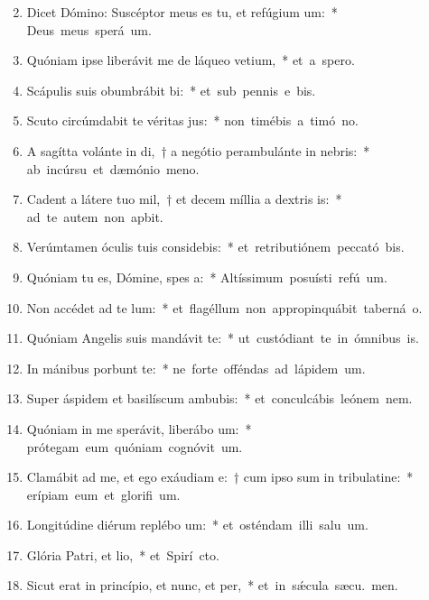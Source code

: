 \begin{flushleft}
\begin{enumerate}[leftmargin=*]
\setcounter{enumi}{1}

\item Dicet Dómino: Suscéptor meus es tu, et refúgium um:~* \mbox{Deus meus sperá  um.}
\item Quóniam ipse liberávit me de láqueo vetium,~* \mbox{et a  spero.}
\item Scápulis suis obumbrábit bi:~* \mbox{et sub pennis e bis.}
\item Scuto circúmdabit te véritas jus:~* \mbox{non timébis a timó no.}
\item A sagítta volánte in di,~† a negótio perambulánte in nebris:~* \mbox{ab incúrsu et dæmónio meno.}
\item Cadent a látere tuo mil,~† et decem míllia a dextris is:~* \mbox{ad te autem non apbit.}
\item Verúmtamen óculis tuis considebis:~* \mbox{et retributiónem peccató bis.}
\item Quóniam tu es, Dómine, spes a:~* \mbox{Altíssimum posuísti refú um.}
\item Non accédet ad te lum:~* \mbox{et flagéllum non appropinquábit taberná o.}
\item Quóniam Angelis suis mandávit  te:~* \mbox{ut custódiant te in ómnibus  is.}
\item In mánibus porbunt te:~* \mbox{ne forte offéndas ad lápidem  um.}
\item Super áspidem et basilíscum ambubis:~* \mbox{et conculcábis leónem  nem.}
\item Quóniam in me sperávit, liberábo um:~* \mbox{prótegam eum quóniam cognóvit  um.}
\item Clamábit ad me, et ego exáudiam e:~† cum ipso sum in tribulatine:~* \mbox{erípiam eum et glorifi um.}
\item Longitúdine diérum replébo um:~* \mbox{et osténdam illi salu um.}
\item Glória Patri, et lio,~* \mbox{et Spirí cto.}
\item Sicut erat in princípio, et nunc, et per,~* \mbox{et in s\'{\ae}cula sæcu. men.}

\end{enumerate}
\end{flushleft}


